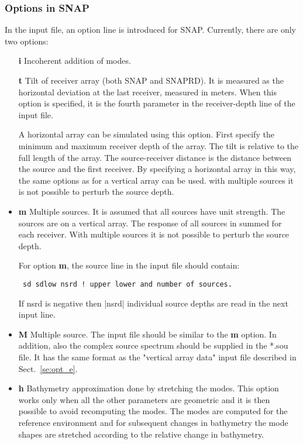\documentclass{saclantc}
\begin{document}
\subsubsection{Options in SNAP}
In the input file,  an option line is introduced for {\sf SNAP}. 
Currently, there are only two options:
\begin{itemize}
 \item[\bf i]     Incoherent addition of modes.
 \item[\bf t] Tilt of receiver array (both {\sf SNAP} and {\sf SNAPRD}). 
It is measured
as the horizontal deviation at the last receiver, measured in
meters. When this option is specified, it is the fourth parameter in
the receiver-depth line of the input file.  

A horizontal array can be simulated using this option. First specify
the minimum and maximum receiver depth of the array. The tilt
is relative to the full length of the array. The source-receiver distance
is the distance between the source and the first receiver. By
specifying a horizontal array in this way, the same options as for a
vertical array can be used.
with multiple sources it is not possible to perturb the source depth.

\item {\bf m} Multiple sources.
It is assumed that all sources have unit strength. The sources are on a
vertical array.  The response of all sources in summed for each
receiver. With multiple sources it is not possible to perturb the source depth.


For option {\bf m},  the source line in the input file should
contain:

{\tt
sd sdlow  nsrd          ! upper lower and number of sources.
}

If nsrd is negative then |nsrd| individual source depths are read in the next
input line.

\item{\bf M} Multiple source. The input file should be similar to the {\bf
m} option. In addition, also the complex source spectrum should be
supplied in the *.sou file. It has the same format as the "vertical
array data" input file described in Sect.\ \ref{se:opt_e}.

\item{\bf h} Bathymetry approximation done by stretching the modes.
This option works only when all the other parameters are geometric and  
it is then possible to avoid recomputing the modes. The modes are computed for the reference environment and for subsequent changes in bathymetry the mode shapes are stretched according to the relative change in bathymetry. 
 

\end{itemize}
\end{document}
